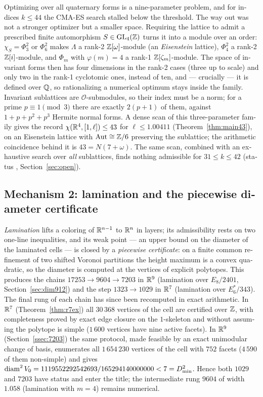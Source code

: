 \begin{otherlanguage}{english}
Optimizing over all quaternary forms is a nine-parameter problem, and for
indices $k\le44$ the CMA-ES search stalled below the threshold. The way out
was not a stronger optimizer but a smaller space. Requiring the lattice to
admit a prescribed finite automorphism $S\in\mathrm{GL}_4(\mathbb{Z})$ turns it into a
module over an order: $\chi_S=\Phi_3^2$ or $\Phi_6^2$ makes $\Lambda$ a rank-2
$\mathbb{Z}[\omega]$-module (an \emph{Eisenstein} lattice), $\Phi_4^2$ a rank-2
$\mathbb{Z}[i]$-module, and $\Phi_m$ with $\varphi(m)=4$ a rank-1 $\mathbb{Z}[\zeta_m]$-module.
The space of invariant forms then has four dimensions in the rank-2 cases
(three up to scale) and only two in the rank-1 cyclotomic ones, instead of ten,
and --- crucially --- it is defined over $\mathbb{Q}$, so rationalizing a numerical
optimum stays inside the family. Invariant sublattices are
$\mathcal O$-submodules, so their index must be a norm; for a prime
$p\equiv1\pmod 3$ there are exactly $2(p+1)$ of them, against
$1+p+p^2+p^3$ Hermite normal forms. A dense scan of this three-parameter
family gives the record $\chi(\mathbb{R}^4,[1,\ell])\le43$ for $\ell\le1.00411$
(Theorem~\ref{thm:main43}), on an Eisenstein lattice with
$\mathrm{Aut}\cong\mathbb{Z}/6$ preserving the sublattice; the arithmetic coincidence
behind it is $43=N(7+\omega)$. The same scan, combined with an exhaustive
search over \emph{all} sublattices, finds nothing admissible for
$31\le k\le42$ (status \textbf{\cyrbadge{[Э]}}, Section~\ref{sec:open}).

\subsection*{Mechanism 2: lamination and the piecewise diameter certificate}

\emph{Lamination} lifts a coloring of $\mathbb{R}^{n-1}$ to $\mathbb{R}^n$ in layers; its
admissibility rests on two one-line inequalities, and its weak point --- an
upper bound on the diameter of the laminated cells --- is closed by a
\emph{piecewise certificate}: on a finite common refinement of two shifted
Voronoi partitions the height maximum is a convex quadratic, so the diameter
is computed at the vertices of explicit polytopes. This produces the chains
$17253\to9604\to7203$ in $\mathbb{R}^9$ (lamination over $E_8/2401$,
Section~\ref{sec:dim912}) and the step $1323\to1029$ in $\mathbb{R}^7$ (lamination
over $E_6^*/343$). The final rung of each chain has since been recomputed in
exact arithmetic. In $\mathbb{R}^7$ (Theorem~\ref{thm:r7ex}) all $30\,368$ vertices
of the cell are certified over $\mathbb{Z}$, with completeness proved by exact edge
closure on the $1$-skeleton and without assuming the polytope is simple
($1\,600$ vertices have nine active facets). In $\mathbb{R}^9$
(Section~\ref{ssec:7203}) the same protocol, made feasible by an exact
unimodular change of basis, enumerates all $1\,654\,230$ vertices of the cell
with $752$ facets ($4\,590$ of them non-simple) and gives
$\operatorname{diam}^2V_0=1119552292542693/165294140000000<7=D_{\min}^2$. Hence both $1029$
and $7203$ have status \stC{} and enter the title; the intermediate rung
$9604$ of width $1.058$ (lamination with $m=4$) remains numerical.


\end{otherlanguage}
